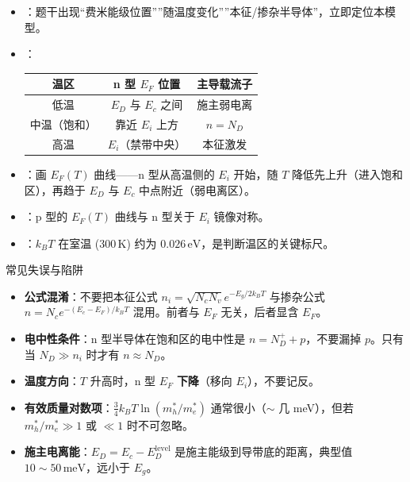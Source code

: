 \begin{tipbox}[快速识别与解题技巧]
\begin{itemize}
    \item {}：题干出现``费米能级位置''''随温度变化''''本征/掺杂半导体''，立即定位本模型。
    \item {}：
    \begin{center}
    \begin{tabular}{ccc}
    \toprule
    \textbf{温区} & \textbf{n 型 $E_F$ 位置} & \textbf{主导载流子} \\
    \midrule
    低温 & $E_D$ 与 $E_c$ 之间 & 施主弱电离 \\
    中温（饱和） & 靠近 $E_i$ 上方 & $n=N_D$ \\
    高温 & $E_i$（禁带中央） & 本征激发 \\
    \bottomrule
    \end{tabular}
    \end{center}
    \item {}：画 $E_F(T)$ 曲线——n 型从高温侧的 $E_i$ 开始，随 $T$ 降低先上升（进入饱和区），再趋于 $E_D$ 与 $E_c$ 中点附近（弱电离区）。
    \item {}：p 型的 $E_F(T)$ 曲线与 n 型关于 $E_i$ 镜像对称。
    \item {}：$k_BT$ 在室温 ($300\,\text{K}$) 约为 $0.026\,\text{eV}$，是判断温区的关键标尺。
\end{itemize}
\end{tipbox}

\begin{errorbox}{常见失误与陷阱}
\begin{itemize}
    \item \textbf{公式混淆}：不要把本征公式 $n_i=\sqrt{N_cN_v}e^{-E_g/2k_BT}$ 与掺杂公式 $n=N_ce^{-(E_c-E_F)/k_BT}$ 混用。前者与 $E_F$ 无关，后者显含 $E_F$。
    \item \textbf{电中性条件}：n 型半导体在饱和区的电中性是 $n=N_D^++p$，不要漏掉 $p$。只有当 $N_D\gg n_i$ 时才有 $n\approx N_D$。
    \item \textbf{温度方向}：$T$ 升高时，n 型 $E_F$ \textbf{下降}（移向 $E_i$），不要记反。
    \item \textbf{有效质量对数项}：$\frac{3}{4}k_BT\ln(m_h^*/m_e^*)$ 通常很小（$\sim$ 几 meV），但若 $m_h^*/m_e^*\gg1$ 或 $\ll1$ 时不可忽略。
    \item \textbf{施主电离能}：$E_D=E_c-E_D^{\text{level}}$ 是施主能级到导带底的距离，典型值 $10\sim50\,\text{meV}$，远小于 $E_g$。
\end{itemize}
\end{errorbox}

